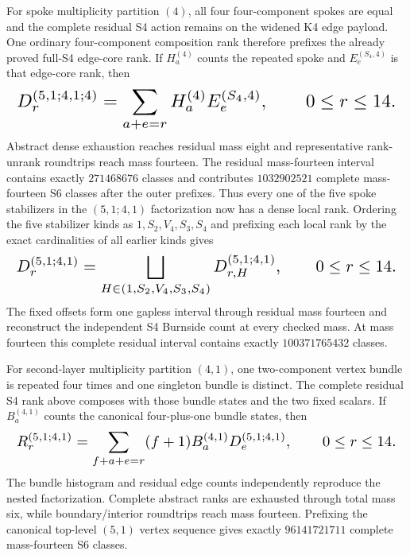 \documentclass{article}
\newcommand{\fitmath}[1]{\resizebox{0.99\linewidth}{!}{$\displaystyle #1$}}
\begin{document}
For spoke multiplicity partition $(4)$, all four four-component spokes are
equal and the complete residual S4 action remains on the widened K4 edge
payload. One ordinary four-component composition rank therefore prefixes the
already proved full-S4 edge-core rank. If $H_a^{(4)}$ counts the repeated spoke
and $E_e^{(S_4,4)}$ is that edge-core rank, then
\begin{equation}
  \fitmath{%
    D_r^{(5,1;4,1;4)}=
      \sum_{a+e=r}H_a^{(4)}E_e^{(S_4,4)},
    \qquad 0\leq r\leq14.
  }
  \label{eq:optimization-crazy-sextuple-s6-s5-s4-full-spoke-ranking}
\end{equation}
Abstract dense exhaustion reaches residual mass eight and representative
rank-unrank roundtrips reach mass fourteen. The residual mass-fourteen interval
contains exactly $271468676$ classes and contributes $1032902521$ complete
mass-fourteen S6 classes after the outer prefixes. Thus every one of the five
spoke stabilizers in the $(5,1;4,1)$ factorization now has a dense local rank.
Ordering the five stabilizer kinds as $1,S_2,V_4,S_3,S_4$ and prefixing each
local rank by the exact cardinalities of all earlier kinds gives
\begin{equation}
  \fitmath{%
    D_r^{(5,1;4,1)}=
      \bigsqcup_{H\in(1,S_2,V_4,S_3,S_4)}D_{r,H}^{(5,1;4,1)},
    \qquad 0\leq r\leq14.
  }
  \label{eq:optimization-crazy-sextuple-s6-s5-s4-complete-spoke-ranking}
\end{equation}
The fixed offsets form one gapless interval through residual mass fourteen and
reconstruct the independent S4 Burnside count at every checked mass. At mass
fourteen this complete residual interval contains exactly $100371765432$
classes.

For second-layer multiplicity partition $(4,1)$, one two-component vertex bundle
is repeated four times and one singleton bundle is distinct. The complete
residual S4 rank above composes with those bundle states and the two fixed
scalars. If $B_a^{(4,1)}$ counts the canonical four-plus-one bundle states, then
\begin{equation}
  \fitmath{%
    R_r^{(5,1;4,1)}=
      \sum_{f+a+e=r}(f+1)B_a^{(4,1)}D_e^{(5,1;4,1)},
    \qquad 0\leq r\leq14.
  }
  \label{eq:optimization-crazy-sextuple-s6-s5-s4-bundle-ranking}
\end{equation}
The bundle histogram and residual edge counts independently reproduce the
nested factorization. Complete abstract ranks are exhausted through total mass
six, while boundary/interior roundtrips reach mass fourteen. Prefixing the
canonical top-level $(5,1)$ vertex sequence gives exactly $96141721711$
complete mass-fourteen S6 classes.
\end{document}
